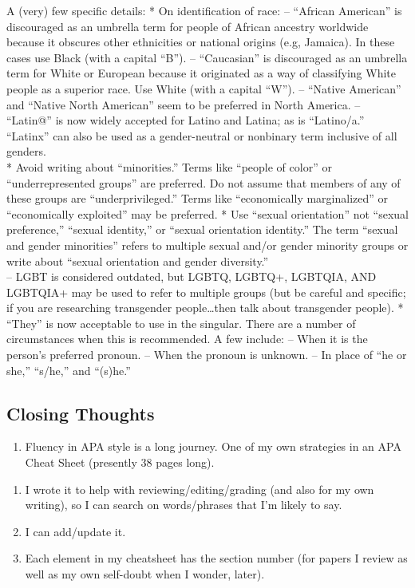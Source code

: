 \documentclass[
  english,
]{book}
\providecommand{\tightlist}{%
  \setlength{\itemsep}{0pt}\setlength{\parskip}{0pt}}
\begin{document}
A (very) few specific details:
* On identification of race:
-- ``African American'' is discouraged as an umbrella term for people of African ancestry worldwide because it obscures other ethnicities or national origins (e.g, Jamaica). In these cases use Black (with a capital ``B'').
-- ``Caucasian'' is discouraged as an umbrella term for White or European because it originated as a way of classifying White people as a superior race. Use White (with a capital ``W'').
-- ``Native American'' and ``Native North American'' seem to be preferred in North America.
-- ``Latin@'' is now widely accepted for Latino and Latina; as is ``Latino/a.'' ``Latinx'' can also be used as a gender-neutral or nonbinary term inclusive of all genders.\\
* Avoid writing about ``minorities.'' Terms like ``people of color'' or ``underrepresented groups'' are preferred. Do not assume that members of any of these groups are ``underprivileged.'' Terms like ``economically marginalized'' or ``economically exploited'' may be preferred.
* Use ``sexual orientation'' not ``sexual preference,'' ``sexual identity,'' or ``sexual orientation identity.'' The term ``sexual and gender minorities'' refers to multiple sexual and/or gender minority groups or write about ``sexual orientation and gender diversity.''\\
-- LGBT is considered outdated, but LGBTQ, LGBTQ+, LGBTQIA, AND LGBTQIA+ may be used to refer to multiple groups (but be careful and specific; if you are researching transgender people\ldots then talk about transgender people).
* ``They'' is now acceptable to use in the singular. There are a number of circumstances when this is recommended. A few include:
-- When it is the person's preferred pronoun.
-- When the pronoun is unknown.
-- In place of ``he or she,'' ``s/he,'' and ``(s)he.''

\hypertarget{closing-thoughts}{%
\subsection{Closing Thoughts}\label{closing-thoughts}}

\begin{enumerate}
\def\labelenumi{\arabic{enumi}.}
\tightlist
\item
  Fluency in APA style is a long journey. One of my own strategies in an APA Cheat Sheet (presently 38 pages long).
\end{enumerate}

\begin{enumerate}
\def\labelenumi{\alph{enumi}.}
\tightlist
\item
  I wrote it to help with reviewing/editing/grading (and also for my own writing), so I can search on words/phrases that I'm likely to say.
\item
  I can add/update it.
\item
  Each element in my cheatsheet has the section number (for papers I review as well as my own self-doubt when I wonder, later).
\end{enumerate}
\end{document}
